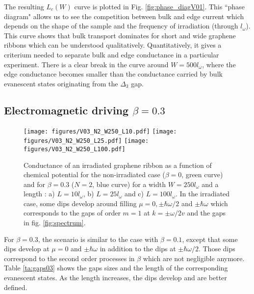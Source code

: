 \documentclass[aps,prb,showpacs,superscriptaddress,twocolumn,10pt,floatfix]{revtex4-1}
\begin{document}
The resulting $L_c(W)$ curve is plotted in Fig. \ref{fig:phase_diagV01}. This ``phase diagram" allows us to see the competition between bulk and edge current which depends on the shape of the sample and the frequency of irradiation (through $l_\omega$). This curve shows that bulk transport dominates for short and wide graphene ribbons which can be understood qualitatively. Quantitatively, it gives a criterium needed to separate bulk and edge conductance in a particular experiment. There is a clear break in the curve around $W=500l_\omega$, where the edge conductance becomes smaller than the conductance carried by bulk evanescent states originating from the $\Delta_3$ gap.


\subsection{Electromagnetic driving $\beta=0.3$}



\begin{figure}[h!]
	\texttt{[image: figures/V03\_N2\_W250\_L10.pdf]}
	\texttt{[image: figures/V03\_N2\_W250\_L25.pdf]}
	\texttt{[image: figures/V03\_N2\_W250\_L100.pdf]}
	\caption{Conductance of an irradiated graphene ribbon as a function of chemical potential for the non-irradiated case ($\beta=0$, green curve) and  for $\beta=0.3$ ($N=2$, blue curve) for a width $W=250l_\omega$ and a length : a) $L=10l_\omega$, b) $L=25l_\omega$ and c) $L=100l_\omega$. In the irradiated case, some dips develop around filling $\mu=0,\pm\hbar \omega/2$ and $\pm\hbar \omega$ which corresponds to the gaps of order $m=1$ at $k=\pm\omega/2v$ and the gaps in fig. \ref{fig:spectrum}.}
	\label{fig:condV03}
\end{figure}


For $\beta=0.3$, the scenario is similar to the case with $\beta=0.1$, except that some dips develop at $\mu=0$ and $\pm\hbar\omega$ in addition to the dips at $\pm\hbar\omega/2$. Those dips correspond to the second order processes in $\beta$ which are not negligible anymore. Table \ref{ta:gaps03} shows the gaps sizes and the length of the corresponding evanescent states. As the length increases, the dips develop and are better defined.
 
\end{document}
